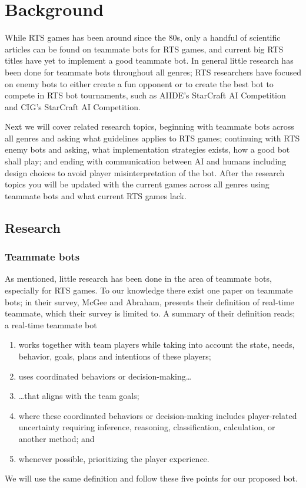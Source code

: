\chapter{Background}
While RTS games has been around since the 80s\cite{adams06, rtsHistory}, only a handful of scientific articles can be found on teammate bots for RTS games, and current big RTS titles have yet to implement a good teammate bot. In general little research has been done for teammate bots throughout all genres; RTS researchers have focused on enemy bots to either create a fun opponent\cite{hagelback09} or to create the best bot to compete in RTS bot tournaments, such as  AIIDE's StarCraft AI Competition\cite{scaiide} and CIG's StarCraft AI Competition\cite{sccig}.

Next we will cover related research topics, beginning with teammate bots across all genres and asking what guidelines applies to RTS games; continuing with RTS enemy bots and asking, what implementation strategies exists, how a good bot shall play; and ending with communication between AI and humans including design choices to avoid player misinterpretation of the bot. After the research topics you will be updated with the current games across all genres using teammate bots and what current RTS games lack.

\section{Research}
\subsection{Teammate bots}
\label{sec:teammate_bots}
As mentioned, little research has been done in the area of teammate bots, especially for RTS games. To our knowledge there exist one paper on teammate bots\cite{mcgee10}; in their survey, McGee and Abraham, presents their definition of real-time teammate, which their survey is limited to. A summary of their definition reads; a real-time teammate bot
\begin{enumerate}
	\item works together with team players while taking into account the state, needs, behavior, goals, plans and intentions of these players;
	\item uses coordinated behaviors or decision-making\ldots
	\item {\ldots}that aligns with the team goals;
	\item where these coordinated behaviors or decision-making includes player-related uncertainty requiring inference, reasoning, classification, calculation, or another method; and
	\item whenever possible, prioritizing the player experience.
\end{enumerate}
We will use the same definition and follow these five points for our proposed bot.

